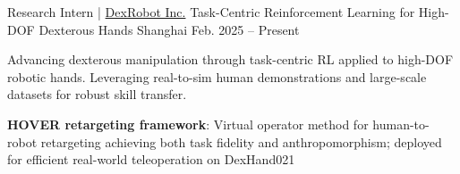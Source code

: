 
\vspace{-8mm}

\allowdisplaybreaks
\raggedbottom

\begin{cventries}
    \cventry
      {Research Intern | \href{https://dex-robot.com}{DexRobot Inc.}} %
      {Task-Centric Reinforcement Learning for High-DOF Dexterous Hands} %
      {Shanghai} %
      {Feb. 2025 -- Present} %
      {
        Advancing dexterous manipulation through task-centric RL applied to high-DOF robotic hands. Leveraging real-to-sim human demonstrations and large-scale datasets for robust skill transfer.
        \begin{cvitems}
          \item{\textbf{HOVER retargeting framework}: Virtual operator method for human-to-robot retargeting achieving both task fidelity and anthropomorphism; deployed for efficient real-world teleoperation on DexHand021}
          \end{cvitems}
      }
        \end{cventries}
\clearpage
